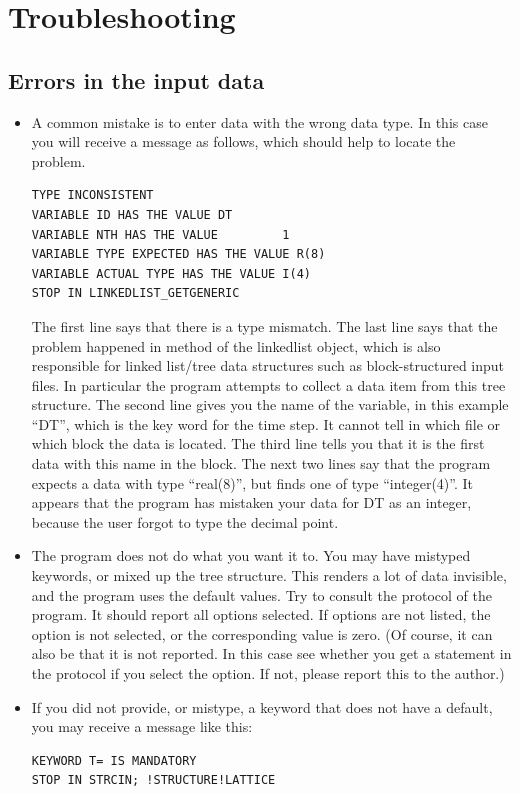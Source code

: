 \documentclass[final,12pt,makeidx,DIV=calc]{article}
\begin{document}
{{{%

\newpage
\section{Troubleshooting}

\subsection{Errors in the input data}

\begin{itemize}
\item A common mistake is to enter data with the wrong data type.
  In this case you will receive a message as follows, which should help
  to locate the problem.
\begin{verbatim}
TYPE INCONSISTENT
VARIABLE ID HAS THE VALUE DT
VARIABLE NTH HAS THE VALUE         1
VARIABLE TYPE EXPECTED HAS THE VALUE R(8)
VARIABLE ACTUAL TYPE HAS THE VALUE I(4)
STOP IN LINKEDLIST_GETGENERIC
\end{verbatim}
The first line says that there is a type mismatch. The last line
says that the problem happened in method of the linkedlist object,
which is also responsible for linked list/tree data structures such as
block-structured input files. In particular the program attempts to
collect a data item from this tree structure.  The second line gives
you the name of the variable, in this example ``DT'', which is the key
word for the time step. It cannot tell in which file or which block
the data is located. The third line tells you that it is the first
data with this name in the block. The next two lines say that the
program expects a data with type ``real(8)'', but finds one of type
``integer(4)''. It appears that the program has mistaken your data for
DT as an integer, because the user forgot to type the decimal point.
\item The program does not do what you want it to. You may have mistyped
  keywords, or mixed up the tree structure. This renders a lot of data
  invisible, and the program uses the default values. Try to consult
  the protocol of the program. It should report all options selected.
  If options are not listed, the option is not selected, or the
  corresponding value is zero. (Of course, it can also be that it is
  not reported. In this case see whether you get a statement in the
  protocol if you select the option. If not, please report this to the
  author.)
\item If you did not provide, or mistype, a keyword that does not have
  a default, you may receive a message like this:
\begin{verbatim}
KEYWORD T= IS MANDATORY
STOP IN STRCIN; !STRUCTURE!LATTICE
\end{verbatim}


\end{itemize}}}}
\end{document}
